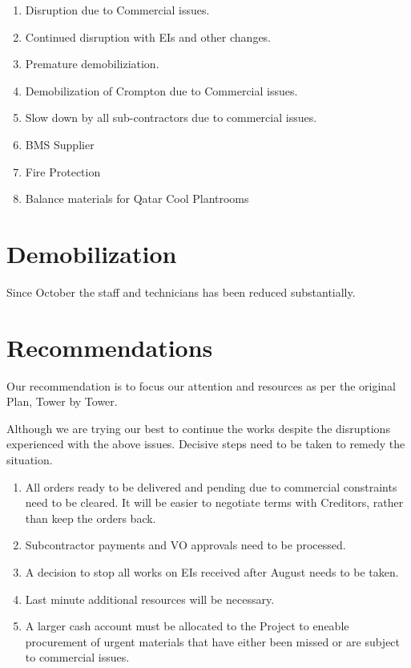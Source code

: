 \begin{enumerate}
\item Disruption due to Commercial issues.
\item Continued disruption with EIs and other changes.
\item Premature demobiliziation.
\item Demobilization of Crompton due to Commercial issues.
\item Slow down by all sub-contractors due to commercial issues.
\item BMS Supplier
\item Fire Protection
\item Balance materials for Qatar Cool Plantrooms
\end{enumerate}

\section*{Demobilization}

Since October the staff and technicians has been reduced substantially. 

\section*{Recommendations}
Our recommendation is to focus our attention and resources as per the original Plan, Tower by Tower.

Although we are trying our best to continue the works despite the disruptions experienced with the above issues. Decisive steps need to be taken to remedy the situation.

\begin{enumerate}
\item All orders ready to be delivered and pending due to commercial constraints need to be cleared. It will be easier to negotiate terms with Creditors, rather than keep the orders back.

\item Subcontractor payments and VO approvals need to be processed.


\item A decision to stop all works on EIs received after August needs to be taken.

\item Last minute additional resources will be necessary.

\item A larger cash account must be allocated to the Project to eneable procurement of urgent materials that have either been missed or are subject to commercial issues.

\end{enumerate}

